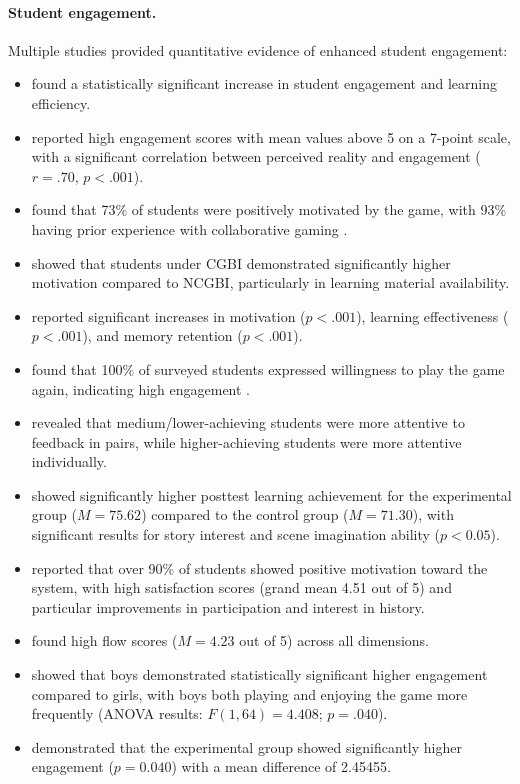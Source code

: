 \documentclass[a4paper,fleqn]{cas-sc}
\begin{document}
\paragraph{Student engagement.}

Multiple studies provided quantitative evidence of enhanced student engagement:

\begin{itemize}[noitemsep]
 \item \citet{1Barbatsis201159} found a statistically significant increase in student engagement and learning efficiency.
 \item \citet{5kazanidis2018alpha} reported high engagement scores with mean values above 5 on a 7-point scale, with a significant correlation between perceived reality and engagement ($r=.70$, $p<.001$).
 \item \citet{6Czerwinski2018} found that 73\% of students were positively motivated by the game, with 93\% having prior experience with collaborative gaming \citep{6Czerwinski2018}.
 
 \item \citet{8Yu2014} showed that students under CGBI demonstrated significantly higher motivation compared to NCGBI, particularly in learning material availability.
 \item \citet{9Lin2018} reported significant increases in motivation ($p<.001$), learning effectiveness ($p<.001$), and memory retention ($p<.001$).
 \item \citet{13Humpire2022} found that 100\% of surveyed students expressed willingness to play the game again, indicating high engagement \citep{13Humpire2022}.
 
 \item \citet{11Ternblad2023115} revealed that medium/lower-achieving students were more attentive to feedback in pairs, while higher-achieving students were more attentive individually.
 \item \citet{28Chao201734} showed significantly higher posttest learning achievement for the experimental group ($M=75.62$) compared to the control group ($M=71.30$), with significant results for story interest and scene imagination ability ($p<0.05$).
 \item \citet{52Lin2011265} reported that over 90\% of students showed positive motivation toward the system, with high satisfaction scores (grand mean 4.51 out of 5) and particular improvements in participation and interest in history.
 
 \item \citet{63Liu2021} found high flow scores ($M=4.23$ out of 5) across all dimensions.
 \item \citet{66Rahmawati2023163} showed that boys demonstrated statistically significant higher engagement compared to girls, with boys both playing and enjoying the game more frequently (ANOVA results: $F(1,64)=4.408$; $p=.040$).
 \item \citet{72hutauruk2020utilization} demonstrated that the experimental group showed significantly higher engagement ($p=0.040$) with a mean difference of 2.45455.
\end{itemize}
\end{document}
